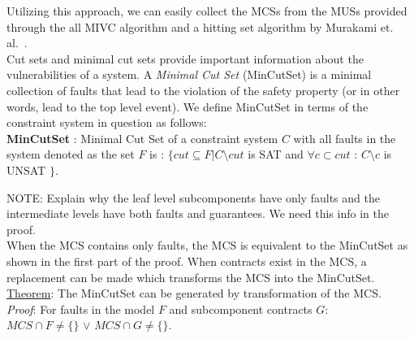 Utilizing this approach, we can easily collect the MCSs from the MUSs provided through the all MIVC algorithm and a hitting set algorithm by Murakami et. al.~\cite{murakami2013efficient,gainer2017minimal}. \\

Cut sets and minimal cut sets provide important information about the vulnerabilities of a system. A \textit{Minimal Cut Set} (MinCutSet) is a minimal collection of faults that lead to the violation of the safety property (or in other words, lead to the top level event). We define MinCutSet in terms of the constraint system in question as follows:\\

\textbf{MinCutSet} : Minimal Cut Set of a constraint system $C$ with all faults in the system denoted as the set $F$ is : $\{ cut \subseteq F | C \setminus cut$ is SAT and $\forall c \subset cut$ : $C \setminus c$ is UNSAT $\}$. 


NOTE: Explain why the leaf level subcomponents have only faults and the intermediate levels have both faults and guarantees. We need this info in the proof. \\

When the MCS contains only faults, the MCS is equivalent to the MinCutSet as shown in the first part of the proof. When contracts exist in the MCS, a replacement can be made which transforms the MCS into the MinCutSet. \\

\underline{Theorem}: The MinCutSet can be generated by transformation of the MCS.\\


\textit{Proof}: For faults in the model $F$ and subcomponent contracts $G$:\\ $MCS \cap F \neq \{\}$ $\lor$ $MCS \cap G \neq \{\}$.\\

